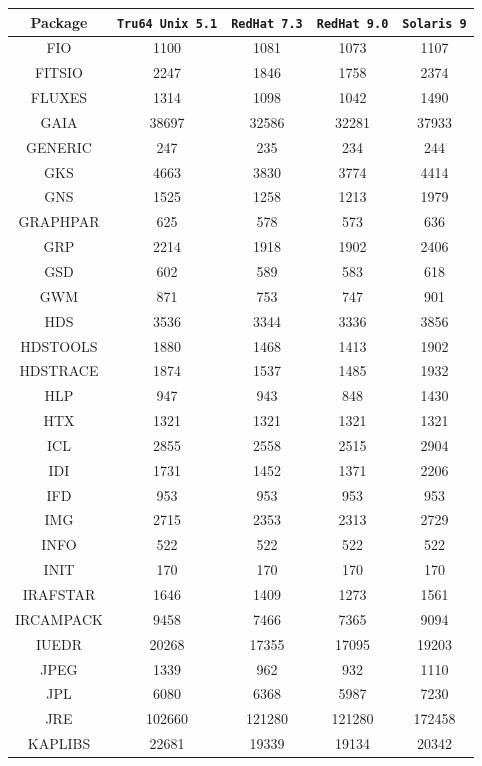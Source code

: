 \documentclass[twoside,11pt]{article}
\renewcommand{\_}{\texttt{\symbol{95}}}
\begin{document}
\begin{table}[p]
\begin{center}
\begin{tabular}{|c|c|c|c|c|}
\hline \hline
\textbf{Package} & \texttt{Tru64 Unix 5.1} & \texttt{RedHat 7.3} & \texttt{RedHat 9.0} & \texttt{Solaris 9} \\ \hline \hline
\hline
FIO & 1100 & 1081 & 1073 & 1107 \\ 
FITSIO & 2247 & 1846 & 1758 & 2374 \\ 
FLUXES & 1314 & 1098 & 1042 & 1490 \\ 
GAIA & 38697 & 32586 & 32281 & 37933 \\ 
GENERIC & 247 & 235 & 234 & 244 \\ 
GKS & 4663 & 3830 & 3774 & 4414 \\ 
GNS & 1525 & 1258 & 1213 & 1979 \\ 
GRAPHPAR & 625 & 578 & 573 & 636 \\ 
GRP & 2214 & 1918 & 1902 & 2406 \\ 
GSD & 602 & 589 & 583 & 618 \\ 
GWM & 871 & 753 & 747 & 901 \\ 
HDS & 3536 & 3344 & 3336 & 3856 \\ 
HDSTOOLS & 1880 & 1468 & 1413 & 1902 \\ 
HDSTRACE & 1874 & 1537 & 1485 & 1932 \\ 
HLP & 947 & 943 & 848 & 1430 \\ 
HTX & 1321 & 1321 & 1321 & 1321 \\ 
ICL & 2855 & 2558 & 2515 & 2904 \\ 
IDI & 1731 & 1452 & 1371 & 2206 \\ 
IFD & 953 & 953 & 953 & 953 \\ 
IMG & 2715 & 2353 & 2313 & 2729 \\ 
INFO & 522 & 522 & 522 & 522 \\ 
INIT & 170 & 170 & 170 & 170 \\ 
IRAFSTAR & 1646 & 1409 & 1273 & 1561 \\ 
IRCAMPACK & 9458 & 7466 & 7365 & 9094 \\ 
IUEDR & 20268 & 17355 & 17095 & 19203 \\ 
JPEG & 1339 & 962 & 932 & 1110 \\ 
JPL & 6080 & 6368 & 5987 & 7230 \\ 
JRE & 102660 & 121280 & 121280 & 172458 \\ 
KAPLIBS & 22681 & 19339 & 19134 & 20342 \\ 

\end{tabular}
\end{center}
\end{table}
\end{document}
